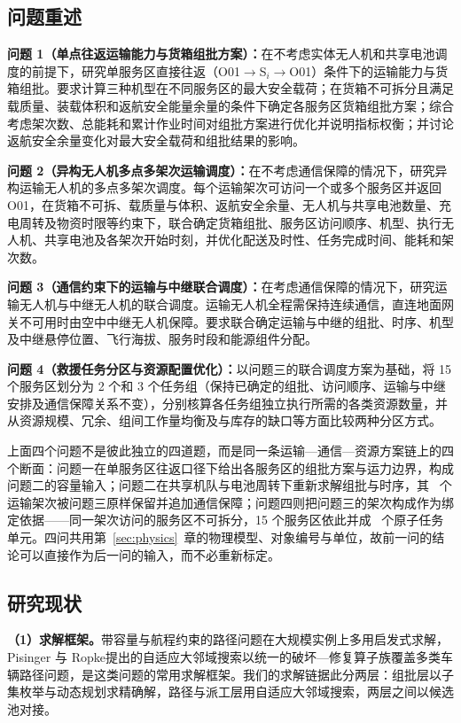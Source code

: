 \subsection{问题重述}

\noindent \textbf{问题 1（单点往返运输能力与货箱组批方案）：}在不考虑实体无人机和共享电池调度的前提下，研究单服务区直接往返（O01$\to$S$_i\to$O01）条件下的运输能力与货箱组批。要求计算三种机型在不同服务区的最大安全载荷；在货箱不可拆分且满足载质量、装载体积和返航安全能量余量的条件下确定各服务区货箱组批方案；综合考虑架次数、总能耗和累计作业时间对组批方案进行优化并说明指标权衡；并讨论返航安全余量变化对最大安全载荷和组批结果的影响。

\noindent \textbf{问题 2（异构无人机多点多架次运输调度）：}在不考虑通信保障的情况下，研究异构运输无人机的多点多架次调度。每个运输架次可访问一个或多个服务区并返回 O01，在货箱不可拆、载质量与体积、返航安全余量、无人机与共享电池数量、充电周转及物资时限等约束下，联合确定货箱组批、服务区访问顺序、机型、执行无人机、共享电池及各架次开始时刻，并优化配送及时性、任务完成时间、能耗和架次数。

\noindent \textbf{问题 3（通信约束下的运输与中继联合调度）：}在考虑通信保障的情况下，研究运输无人机与中继无人机的联合调度。运输无人机全程需保持连续通信，直连地面网关不可用时由空中中继无人机保障。要求联合确定运输与中继的组批、时序、机型及中继悬停位置、飞行海拔、服务时段和能源组件分配。

\noindent \textbf{问题 4（救援任务分区与资源配置优化）：}以问题三的联合调度方案为基础，将 15 个服务区划分为 2 个和 3 个任务组（保持已确定的组批、访问顺序、运输与中继安排及通信保障关系不变），分别核算各任务组独立执行所需的各类资源数量，并从资源规模、冗余、组间工作量均衡及与库存的缺口等方面比较两种分区方式。

上面四个问题不是彼此独立的四道题，而是同一条运输—通信—资源方案链上的四个断面：问题一在单服务区往返口径下给出各服务区的组批方案与运力边界，构成问题二的容量输入；问题二在共享机队与电池周转下重新求解组批与时序，其 \mtQtwoRecTrips\ 个运输架次被问题三原样保留并追加通信保障；问题四则把问题三的架次构成作为绑定依据——同一架次访问的服务区不可拆分，15 个服务区依此并成 \mtQfourUnits\ 个原子任务单元。四问共用第~\ref{sec:physics}~章的物理模型、对象编号与单位，故前一问的结论可以直接作为后一问的输入，而不必重新标定。

\subsection{研究现状}

\noindent\textbf{（1）求解框架。}带容量与航程约束的路径问题在大规模实例上多用启发式求解，Pisinger 与 Ropke\cite{pisinger2007general}提出的自适应大邻域搜索以统一的破坏—修复算子族覆盖多类车辆路径问题，是这类问题的常用求解框架。我们的求解链据此分两层：组批层以子集枚举与动态规划求精确解，路径与派工层用自适应大邻域搜索，两层之间以候选池对接。

